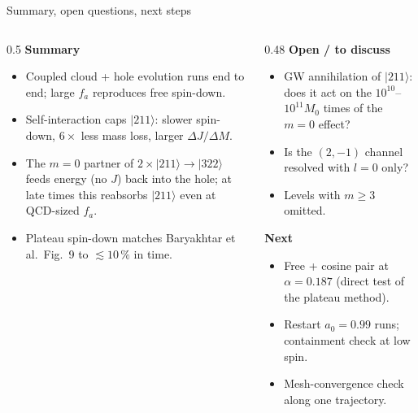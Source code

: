 \documentclass[aspectratio=169,10pt]{beamer}
\newcommand{\ket}[1]{|#1\rangle}
\newcommand{\fa}{f_a}
\begin{document}
\begin{frame}{Summary, open questions, next steps}
  \begin{columns}[T]
    \begin{column}{0.5\textwidth}
      \small
      \textbf{Summary}
      \begin{itemize}
        \item Coupled cloud + hole evolution runs end to end; large $\fa$ reproduces free spin-down.
        \item Self-interaction caps $\ket{211}$: slower spin-down, $6\times$ less mass loss, larger $\Delta J/\Delta M$.
        \item The $m=0$ partner of $2\times\ket{211}\to\ket{322}$ feeds energy (no $J$) back into the hole;
              at late times this reabsorbs $\ket{211}$ even at QCD-sized $\fa$.
        \item Plateau spin-down matches Baryakhtar et al.\ Fig.~9 to $\lesssim 10\,\%$ in time.
      \end{itemize}
    \end{column}
    \begin{column}{0.48\textwidth}
      \small
      \textbf{Open / to discuss}
      \begin{itemize}
        \item GW annihilation of $\ket{211}$: does it act on the $10^{10}$--$10^{11} M_0$ times of the $m=0$ effect?
        \item Is the $(2,-1)$ channel resolved with $l=0$ only?
        \item Levels with $m\ge3$ omitted.
      \end{itemize}
      \textbf{Next}
      \begin{itemize}
        \item Free + cosine pair at $\alpha=0.187$ (direct test of the plateau method).
        \item Restart $a_0 = 0.99$ runs; containment check at low spin.
        \item Mesh-convergence check along one trajectory.
      \end{itemize}
    \end{column}
  \end{columns}
\end{frame}
\end{document}
